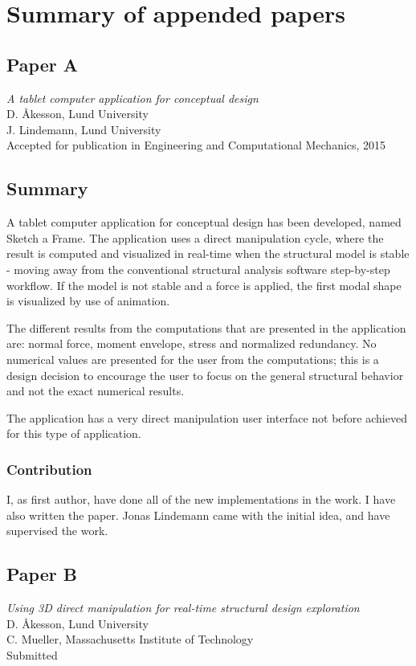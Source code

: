 \chapter{Summary of appended papers}
\label{ch:Summary of appended papers}
\section{Paper A}
\textit{A tablet computer application for conceptual design} \\
D. Åkesson, Lund University \\
J. Lindemann, Lund University \\
Accepted for publication in Engineering and Computational Mechanics, 2015

\section*{Summary}

A tablet computer application for conceptual design has been developed, named Sketch a Frame. The application uses a direct manipulation cycle, where the result is computed and visualized in real-time when the structural model is stable - moving away from the conventional structural analysis software step-by-step workflow. If the model is not stable and a force is applied, the first modal shape is visualized by use of animation.

The different results from the computations that are presented in the application are: normal force, moment envelope, stress and normalized redundancy. No numerical values are presented for the user from the computations; this is a design decision to encourage the user to focus on the general structural behavior and not the exact numerical results. 

The application has a very direct manipulation user interface not before achieved for this type of application.

\subsection*{Contribution}
I, as first author, have done all of the new implementations in the work. I have also written the paper. Jonas Lindemann came with the initial idea, and have supervised the work.

\newpage
\section{Paper B}
\textit{Using 3D direct manipulation for real-time structural design exploration} \\
D. Åkesson, Lund University \\
C. Mueller, Massachusetts Institute of Technology \\
Submitted

